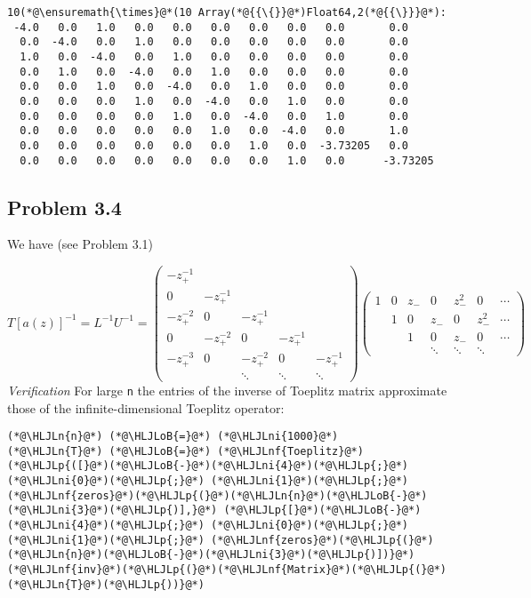 \documentclass[12pt,landscape]{article}
\newcommand{\HLJLn}[1]{#1}
\newcommand{\HLJLnf}[1]{\textcolor[RGB]{66,102,213}{#1}}
\newcommand{\HLJLni}[1]{\textcolor[RGB]{59,151,46}{#1}}
\newcommand{\HLJLoB}[1]{\textcolor[RGB]{102,102,102}{\textbf{#1}}}
\newcommand{\HLJLp}[1]{#1}
\def\sopmatrix#1{ \begin{pmatrix}#1\end{pmatrix} }
\begin{document}
{\begin{lstlisting}
10(*@\ensuremath{\times}@*(10 Array(*@{{\{}}@*)Float64,2(*@{{\}}}@*):
 -4.0   0.0   1.0   0.0   0.0   0.0   0.0   0.0   0.0       0.0
  0.0  -4.0   0.0   1.0   0.0   0.0   0.0   0.0   0.0       0.0
  1.0   0.0  -4.0   0.0   1.0   0.0   0.0   0.0   0.0       0.0
  0.0   1.0   0.0  -4.0   0.0   1.0   0.0   0.0   0.0       0.0
  0.0   0.0   1.0   0.0  -4.0   0.0   1.0   0.0   0.0       0.0
  0.0   0.0   0.0   1.0   0.0  -4.0   0.0   1.0   0.0       0.0
  0.0   0.0   0.0   0.0   1.0   0.0  -4.0   0.0   1.0       0.0
  0.0   0.0   0.0   0.0   0.0   1.0   0.0  -4.0   0.0       1.0
  0.0   0.0   0.0   0.0   0.0   0.0   1.0   0.0  -3.73205   0.0
  0.0   0.0   0.0   0.0   0.0   0.0   0.0   1.0   0.0      -3.73205
\end{lstlisting}


\subsection{Problem 3.4}
We have (see Problem 3.1)

\[
T[a(z)]^{-1} = L^{-1} U^{-1} =
\sopmatrix{-z_+^{-1} \\
0 & -z_+^{-1} \\
-z_+^{-2} & 0 & -z_+^{-1} \\
0 & -z_+^{-2} & 0 & -z_+^{-1} \\
-z_+^{-3} & 0 & -z_+^{-2} & 0 & -z_+^{-1} \\
&&\ddots & \ddots & \ddots
}
\sopmatrix{
1 & 0 & z_- & 0 &z_-^2 & 0 & \cdots \\
& 1 & 0 & z_- & 0 &z_-^2 & \cdots \\
& & 1 & 0 & z_- & 0 & \cdots \\
&&&\ddots & \ddots & \ddots
}
\]
\emph{Verification} For large \texttt{n} the entries of the inverse of Toeplitz matrix approximate those of the infinite-dimensional Toeplitz operator:


\begin{lstlisting}
(*@\HLJLn{n}@*) (*@\HLJLoB{=}@*) (*@\HLJLni{1000}@*)
(*@\HLJLn{T}@*) (*@\HLJLoB{=}@*) (*@\HLJLnf{Toeplitz}@*)(*@\HLJLp{([}@*)(*@\HLJLoB{-}@*)(*@\HLJLni{4}@*)(*@\HLJLp{;}@*) (*@\HLJLni{0}@*)(*@\HLJLp{;}@*) (*@\HLJLni{1}@*)(*@\HLJLp{;}@*) (*@\HLJLnf{zeros}@*)(*@\HLJLp{(}@*)(*@\HLJLn{n}@*)(*@\HLJLoB{-}@*)(*@\HLJLni{3}@*)(*@\HLJLp{)],}@*) (*@\HLJLp{[}@*)(*@\HLJLoB{-}@*)(*@\HLJLni{4}@*)(*@\HLJLp{;}@*) (*@\HLJLni{0}@*)(*@\HLJLp{;}@*) (*@\HLJLni{1}@*)(*@\HLJLp{;}@*) (*@\HLJLnf{zeros}@*)(*@\HLJLp{(}@*)(*@\HLJLn{n}@*)(*@\HLJLoB{-}@*)(*@\HLJLni{3}@*)(*@\HLJLp{)])}@*)
(*@\HLJLnf{inv}@*)(*@\HLJLp{(}@*)(*@\HLJLnf{Matrix}@*)(*@\HLJLp{(}@*)(*@\HLJLn{T}@*)(*@\HLJLp{))}@*)
\end{lstlisting}

}
\end{document}
